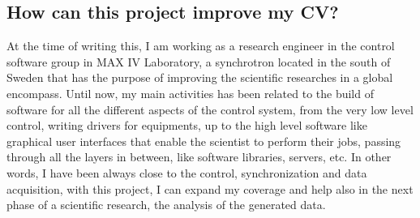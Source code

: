 \subsection{How can this project improve my CV?}
At the time of writing this, I am working as a research engineer in the control software group in MAX IV Laboratory, a synchrotron located in the south of Sweden that has the purpose of improving the scientific researches in a global encompass.
Until now, my main activities has been related to the build of software for all the different aspects of the control system, from the very low level control, writing drivers for equipments, up to the high level software like graphical user interfaces that enable the scientist to perform their jobs, passing through all the layers in between, like software libraries, servers, etc.
In other words, I have been always close to the control, synchronization and data acquisition, with this project, I can expand my coverage and help also in the next phase of a scientific research, the analysis of the generated data.
